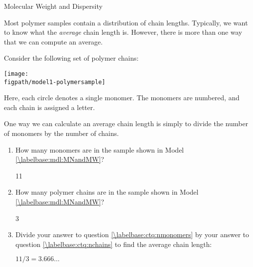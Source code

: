 \begin{activity}{Molecular Weight and Dispersity}
\begin{instructornotes}
\end{instructornotes}

\begin{model}
\label{\labelbase:mdl:MNandMW}

	Most polymer samples contain a distribution of chain lengths.  Typically, we want to know what the \emph{average} chain length is.  However, there is more than one way that we can compute an average.
	
	Consider the following set of polymer chains:
	
		\vspace{6pt}
		\centerline{\texttt{[image: \\figpath/model1-polymersample]}}
	
	Here, each circle denotes a single monomer.  The monomers are numbered, and each chain is assigned a letter.

\end{model}

\vspace{0.05in}
\begin{ctqs}

	\question One way we can calculate an average chain length is simply to divide the number of monomers by the number of chains.
	
		\begin{enumerate}
		
			\item How many monomers are in the sample shown in Model \ref{\labelbase:mdl:MNandMW}?
				\label{\labelbase:ctq:nmonomers}
	
				\begin{solution}[0.5in]
					11
				\end{solution}
	
			\item How many polymer chains are in the sample shown in Model  \ref{\labelbase:mdl:MNandMW}?
				\label{\labelbase:ctq:nchains}
	
				\begin{solution}[0.5in]
					3
				\end{solution}
				
			\item Divide your answer to question \ref{\labelbase:ctq:nmonomers} by your answer to question \ref{\labelbase:ctq:nchains} to find the average chain length:
				\label{\labelbase:ctq:Mnsimple}
	
				\begin{solution}[0.75in]
					$11/3 = 3.666\dots$
				\end{solution}
				

\end{enumerate}
\end{ctqs}
\end{activity}
